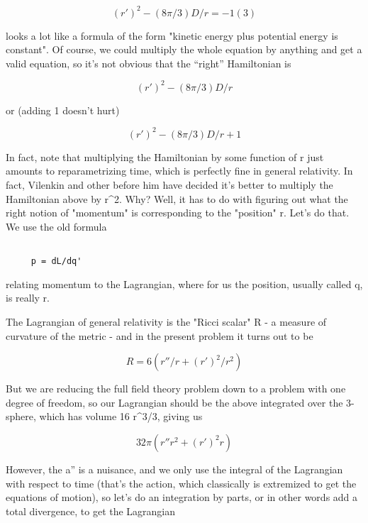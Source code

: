 $$

  (r')^{2} - (8\pi /3) D/r = - 1  						(3)
$$
    

looks a lot like a formula of the form "kinetic energy plus potential
energy is constant".   Of course, we could multiply the whole equation
by anything and get a valid equation, so it's not obvious that the 
``right'' Hamiltonian is


$$

  (r')^{2} - (8\pi /3) D/r
$$
    

or (adding 1 doesn't hurt)


$$

  (r')^{2} - (8\pi /3) D/r + 1
$$
    

In fact, note that multiplying the Hamiltonian by some function of r
just amounts to reparametrizing time, which is perfectly fine in general
relativity.  In fact, Vilenkin and other before him have decided it's
better to multiply the Hamiltonian above by r^{2}.   Why?  Well, it has to
do with figuring out what the right notion of "momentum" is
corresponding to the "position" r.   Let's do that.  We use the old
formula


\begin{verbatim}

     p = dL/dq'
\end{verbatim}
    

relating momentum to the Lagrangian, where for us the position, usually
called q, is really r.

The Lagrangian of general relativity is the "Ricci scalar" R - a measure of
curvature of the metric - and in the present problem it turns out to be


$$

   R = 6 (r''/r + (r')^{2}/r^{2})
$$
    

But we are reducing the full field theory problem down to a problem with
one degree of freedom, so our Lagrangian should be the above integrated
over the 3-sphere, which has volume 16 \pi  r^{3}/3, giving us


$$

   32\pi  (r'' r^{2} + (r')^{2} r)
$$
    

However, the a'' is a nuisance, and we only use the integral of the
Lagrangian with respect to time (that's the action, which classically is
extremized to get the equations of motion), so let's do an integration
by parts, or in other words add a total divergence, to get the Lagrangian


$$

